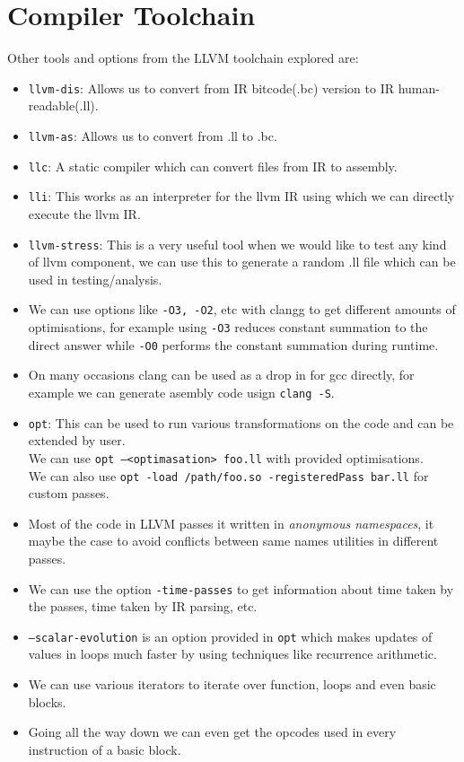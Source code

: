 \documentclass[12pt]{article}
\newcommand{\code}{\texttt}
\begin{document}
\section{Compiler Toolchain}
Other tools and options from the LLVM toolchain explored are:
\begin{itemize}
\item \code{llvm-dis}: Allows us to convert from IR bitcode(.bc) version to IR human-readable(.ll).
\item \code{llvm-as}: Allows us to convert from .ll to .bc.
\item \code{llc}: A static compiler which can convert files from IR to assembly.
\item \code{lli}: This works as an interpreter for the llvm IR using which we can directly execute the llvm IR.
\item \code{llvm-stress}: This is a very useful tool when we would like to test any kind of llvm component, we can use this to generate a random .ll file which can be used in testing/analysis.
\item We can use options like \code{-O3, -O2}, etc with clangg to get different amounts of optimisations, for example using \code{-O3} reduces constant summation to the direct answer while \code{-O0} performs the constant summation during runtime.
\item On many occasions clang can be used as a drop in for gcc directly, for example we can generate asembly code usign \code{clang -S}.
\item \code{opt}: This can be used to run various transformations on the code and can be extended by user.\\
We can use \code{opt --<optimasation> foo.ll} with provided optimisations.\\
We can also use \code{opt -load /path/foo.so -registeredPass bar.ll} for custom passes.
\item Most of the code in LLVM passes it written in \textit{anonymous namespaces}, it maybe the case to avoid conflicts between same names utilities in different passes.
\item We can use the option \code{-time-passes} to get information about time taken by the passes, time taken by IR parsing, etc.
\item  \texttt{--scalar-evolution} is an option provided in \texttt{opt} which makes updates of values in loops much faster by using techniques like recurrence arithmetic.
\item We can use various iterators to iterate over function, loops and even basic blocks.
\item Going all the way down we can even get the opcodes used in every instruction of a basic block.
\end{itemize}
\newpage
\end{document}
